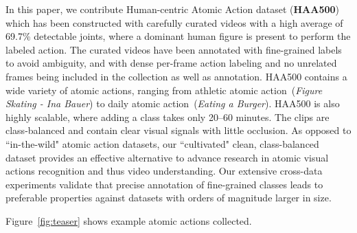 \documentclass[10pt,twocolumn,letterpaper]{article}
\begin{document}
In this paper, we contribute Human-centric Atomic Action dataset (\textbf{HAA500}) which has been constructed with carefully curated videos with a high average of 69.7\% detectable joints, where a dominant human figure is present to perform the labeled action. The curated videos have been annotated with fine-grained labels to avoid ambiguity, and with dense per-frame action labeling and no unrelated frames being included in the collection as well as annotation.
HAA500 contains a wide variety of atomic actions, ranging from athletic atomic action~(\textit{Figure Skating - Ina Bauer}) to daily atomic action~(\textit{Eating a Burger}). 
HAA500 is also highly scalable, where adding a class takes only 20--60 minutes.
The clips are class-balanced and contain clear visual signals with little occlusion. As opposed to ``in-the-wild" atomic action datasets, our ``cultivated" clean, class-balanced dataset provides an effective alternative to advance research in atomic visual actions recognition and thus video understanding.
Our extensive cross-data experiments validate that precise annotation of fine-grained classes leads to preferable properties against datasets with orders of magnitude larger in size.

Figure~\ref{fig:teaser} shows example atomic actions collected. 

\vspace{-0.05in}
\end{document}
